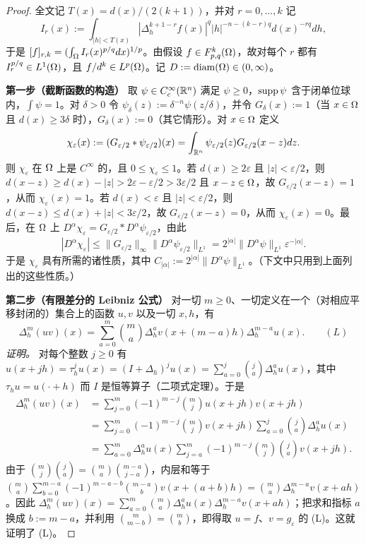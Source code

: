 \begin{proof}
全文记 $T(x) = d(x)/(2(k+1))$，并对 $r = 0,\dots,k$ 记
\[
I_r(x) := \int_{|h|<T(x)} |\Delta_h^{k+1-r} f(x)|^q |h|^{-n-(k-r)q} d(x)^{-rq} dh,
\]
于是 $[f]_{r,k} = ( \int_\Omega I_r(x)^{p/q} dx )^{1/p}$。由假设 $f \in F^k_{p,q}(\Omega)$，故对每个 $r$ 都有 $I_r^{p/q} \in L^1(\Omega)$，且 $f/d^k \in L^p(\Omega)$。记 $D := \operatorname{diam}(\Omega) \in (0,\infty)$。

\textbf{第一步（截断函数的构造）} 取 $\psi \in C_c^\infty(\mathbb{R}^n)$ 满足 $\psi \ge 0$，$\operatorname{supp} \psi$ 含于闭单位球内，$\int \psi = 1$。对 $\delta > 0$ 令 $\psi_\delta(z) := \delta^{-n} \psi(z/\delta)$，并令 $G_\delta(x) := 1$（当 $x \in \Omega$ 且 $d(x) \ge 3 \delta$ 时），$G_\delta(x) := 0$（其它情形）。对 $x \in \Omega$ 定义
\[
\chi_\varepsilon(x) := (G_{\varepsilon/2} * \psi_{\varepsilon/2})(x) = \int_{\mathbb{R}^n} \psi_{\varepsilon/2}(z) G_{\varepsilon/2}(x-z) dz.
\]
则 $\chi_\varepsilon$ 在 $\Omega$ 上是 $C^\infty$ 的，且 $0 \le \chi_\varepsilon \le 1$。若 $d(x) \ge 2 \varepsilon$ 且 $|z| < \varepsilon/2$，则 $d(x-z) \ge d(x) - |z| > 2\varepsilon - \varepsilon/2 > 3\varepsilon/2$ 且 $x-z \in \Omega$，故 $G_{\varepsilon/2}(x-z) = 1$，从而 $\chi_\varepsilon(x) = 1$。若 $d(x) < \varepsilon$ 且 $|z| < \varepsilon/2$，则 $d(x-z) \le d(x) + |z| < 3\varepsilon/2$，故 $G_{\varepsilon/2}(x-z) = 0$，从而 $\chi_\varepsilon(x) = 0$。最后，在 $\Omega$ 上 $D^\alpha \chi_\varepsilon = G_{\varepsilon/2} * D^\alpha \psi_{\varepsilon/2}$，由此
\[
|D^\alpha \chi_\varepsilon| \le \|G_{\varepsilon/2}\|_\infty \|D^\alpha \psi_{\varepsilon/2}\|_{L^1} = 2^{|\alpha|} \|D^\alpha \psi\|_{L^1} \varepsilon^{-|\alpha|}.
\]
于是 $\chi_\varepsilon$ 具有所需的诸性质，其中 $C_{|\alpha|} := 2^{|\alpha|}\|D^\alpha \psi\|_{L^1}$。（下文中只用到上面列出的这些性质。）

\textbf{第二步（有限差分的 Leibniz 公式）} 对一切 $m \ge 0$、一切定义在一个（对相应平移封闭的）集合上的函数 $u, v$ 以及一切 $x, h$，有
\[
\Delta_h^m(uv)(x) = \sum_{a=0}^{m} \binom{m}{a} \Delta_h^a v(x+(m-a)h) \Delta_h^{m-a} u(x). \qquad (L)
\]
\emph{证明。} 对每个整数 $j \ge 0$ 有 $u(x+jh) = \tau_h^j u(x) = (I + \Delta_h)^j u(x) = \sum_{a=0}^{j} \binom{j}{a} \Delta_h^a u(x)$，其中 $\tau_h u = u(\cdot +h)$ 而 $I$ 是恒等算子（二项式定理）。于是
\[
\begin{aligned}
\Delta_h^m(uv)(x) &= \sum_{j=0}^{m} (-1)^{m-j} \binom{m}{j} u(x+jh) v(x+jh) \\
&= \sum_{j=0}^{m} (-1)^{m-j} \binom{m}{j} v(x+jh) \sum_{a=0}^{j} \binom{j}{a} \Delta_h^a u(x) \\
&= \sum_{a=0}^{m} \Delta_h^a u(x) \sum_{j=a}^{m} (-1)^{m-j} \binom{m}{j} \binom{j}{a} v(x+jh).
\end{aligned}
\]
由于 $\binom{m}{j} \binom{j}{a} = \binom{m}{a} \binom{m-a}{j-a}$，内层和等于 $\binom{m}{a} \sum_{b=0}^{m-a} (-1)^{m-a-b} \binom{m-a}{b} v(x+(a+b)h) = \binom{m}{a} \Delta_h^{m-a} v(x+ah)$。因此 $\Delta_h^m(uv)(x) = \sum_{a=0}^{m} \binom{m}{a} \Delta_h^a u(x) \Delta_h^{m-a}v(x+ah)$；把求和指标 $a$ 换成 $b := m-a$，并利用 $\binom{m}{m-b} = \binom{m}{b}$，即得取 $u = f$、$v = g_\varepsilon$ 的 (L)。这就证明了 (L)。


\end{proof}
